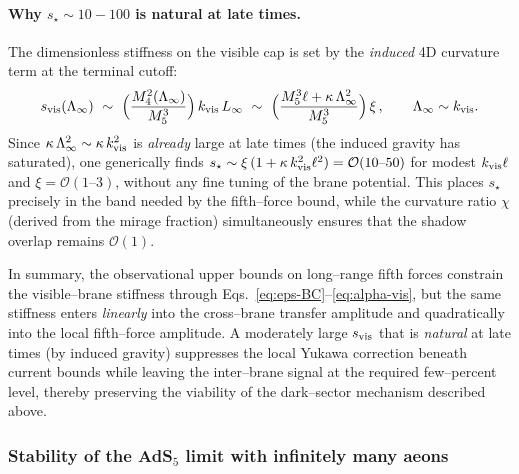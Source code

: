 \documentclass[10pt]{article}
\theoremstyle{definition}
\theoremstyle{plain}
\begin{document}
\paragraph{Why \(s_\star\sim 10\!-\!100\) is natural at late times.}\label{par:uom-main-108}
The dimensionless stiffness on the visible cap is set by the \emph{induced} 4D curvature term at the terminal cutoff:
\[
s_{\rm vis}(\Lambda_\infty)\ \sim\ \Big(\frac{M_4^2(\Lambda_\infty)}{M_5^3}\Big)\,k_{\rm vis}\,L_\infty
\ \sim\ \Big(\frac{M_5^3\ell+\kappa\,\Lambda_\infty^2}{M_5^3}\Big)\,\xi\,,
\qquad \Lambda_\infty\sim k_{\rm vis}.
\]
Since \(\kappa\,\Lambda_\infty^2\sim \kappa\,k_{\rm vis}^2\) is \emph{already} large at late times (the induced gravity
has saturated), one generically finds \(s_\star\sim \xi\,(1+\kappa\,k_{\rm vis}^2\ell^2)=\mathcal O(10\text{--}50)\) for modest
$k_{\rm vis}\ell$ and \(\xi=\mathcal O(1\text{--}3)\), without any fine tuning of the brane potential.
This places \(s_\star\) precisely in the band needed by the fifth–force bound, while the curvature ratio \(\chi\)
(derived from the mirage fraction) simultaneously ensures that the shadow overlap remains $\mathcal O(1)$.


\medskip
\noindent
In summary, the observational upper bounds on long–range fifth forces constrain the visible–brane stiffness through
Eqs.~\eqref{eq:eps-BC}–\eqref{eq:alpha-vis}, but the same stiffness enters \emph{linearly} into the cross–brane transfer amplitude and quadratically into the local fifth–force amplitude. A moderately large $s_{\rm vis}$ that is \emph{natural} at late times (by induced gravity) suppresses the local Yukawa correction beneath current bounds while leaving the inter–brane signal at the required few–percent level, thereby preserving the viability of the dark–sector mechanism described above.



\subsubsection*{\texorpdfstring{Stability of the AdS$_5$ limit with infinitely many aeons}{Stability of the AdS5 limit with infinitely many aeons}}
\label{subsubsec:AdS5-limit-stability}
\end{document}

